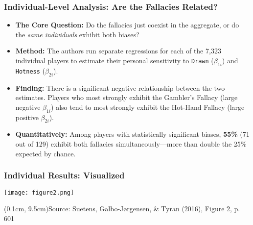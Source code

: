 \documentclass{beamer}
\newcommand{\source}[1]{\begin{textblock*}{\textwidth}(0.1cm, 9.5cm)\tiny Source: #1\end{textblock*}}
\begin{document}
\begin{frame}
    \frametitle{Individual-Level Analysis: Are the Fallacies Related?}
    \begin{itemize}
        \item \textbf{The Core Question:} Do the fallacies just coexist in the aggregate, or do the \textit{same individuals} exhibit both biases?
        \vspace{1em}
        \item \textbf{Method:} The authors run separate regressions for each of the 7,323 individual players to estimate their personal sensitivity to \texttt{Drawn} ($\beta_{1i}$) and \texttt{Hotness} ($\beta_{2i}$).
        \vspace{1em}
        \item \textbf{Finding:} There is a significant negative relationship between the two estimates. Players who most strongly exhibit the Gambler's Fallacy (large negative $\beta_{1i}$) also tend to most strongly exhibit the Hot-Hand Fallacy (large positive $\beta_{2i}$).
        \vspace{0.5em}
        \item \textbf{Quantitatively:} Among players with statistically significant biases, \textbf{55\%} (71 out of 129) exhibit both fallacies simultaneously—more than double the 25\% expected by chance.
    \end{itemize}
\end{frame}

\begin{frame}
    \frametitle{Individual Results: Visualized}
    \begin{center}
        \texttt{[image: figure2.png]}
    \end{center}
    \source{Suetens, Galbo-Jørgensen, \& Tyran (2016), Figure 2, p. 601}
\end{frame}
\end{document}
